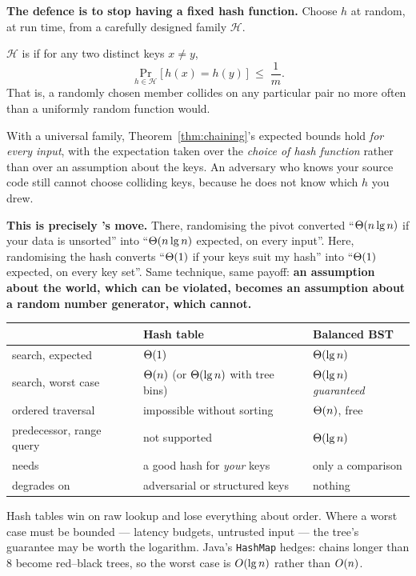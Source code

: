 \begin{conceptbox}
\textbf{The defence is to stop having a fixed hash function.} Choose $h$ at
random, at run time, from a carefully designed family $\mathcal{H}$.

\smallskip
$\mathcal{H}$ is  if for any two distinct keys $x \ne y$,
\[ \Pr_{h \in \mathcal{H}}\bigl[\,h(x) = h(y)\,\bigr] \;\le\; \frac{1}{m}. \]
That is, a randomly chosen member collides on any particular pair no more often
than a uniformly random function would.

\smallskip
With a universal family, Theorem~\ref{thm:chaining}'s expected bounds hold
\emph{for every input}, with the expectation taken over the \emph{choice of
hash function} rather than over an assumption about the keys. An adversary who
knows your source code still cannot choose colliding keys, because he does not
know which $h$ you drew.

\smallskip
\textbf{This is precisely 's move.} There, randomising the
pivot converted ``$\Theta(n\operatorname{lg} n)$ if your data is unsorted'' into
``$\Theta(n\operatorname{lg} n)$ expected, on every input''. Here, randomising the hash
converts ``$\Theta(1)$ if your keys suit my hash'' into ``$\Theta(1)$ expected,
on every key set''. Same technique, same payoff: \textbf{an assumption about
the world, which can be violated, becomes an assumption about a random number
generator, which cannot.}
\end{conceptbox}

\begin{conceptbox}
\begin{longtable}{@{}L{3.6cm}L{5.0cm}L{5.4cm}@{}}
\toprule
{}
& \textbf{Hash table} & \textbf{Balanced BST} \\
\midrule
\endhead
search, expected & $\Theta(1)$ & $\Theta(\operatorname{lg} n)$ \\
search, worst case & $\Theta(n)$ (or $\Theta(\operatorname{lg} n)$ with tree bins) &
  $\Theta(\operatorname{lg} n)$ \emph{guaranteed} \\
ordered traversal & impossible without sorting & $\Theta(n)$, free \\
predecessor, range query & not supported & $\Theta(\operatorname{lg} n)$ \\
needs & a good hash for \emph{your} keys & only a comparison \\
degrades on & adversarial or structured keys & nothing \\
\bottomrule
\end{longtable}

\smallskip
Hash tables win on raw lookup and lose everything about order. Where a
worst case must be bounded --- latency budgets, untrusted input --- the
tree's guarantee may be worth the logarithm. Java's \texttt{HashMap} hedges:
chains longer than 8 become red--black trees, so the worst case is
$O(\operatorname{lg} n)$ rather than $O(n)$.
\end{conceptbox}

